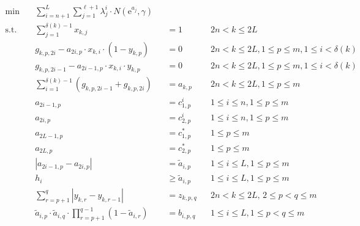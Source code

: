 \documentclass[runningheads]{llncs}
\begin{document}
\begingroup
\allowdisplaybreaks
\begin{align*}
\min\quad        & \sum_{i=n+1}^L\sum_{j=1}^{\ell+1} \lambda^i_j\cdot N(\mathrm e^{a_j},\gamma) & \label{CS} \tag{CSO}\\
\text{s.t.}\quad & \sum_{j=1}^{\delta(k)- 1} x_{k,j}                                  && =     1              && {\scriptstyle 2n < k \leq 2L}\\
                 & g_{k,p,2i}   - a_{2i,p}   \cdot x_{k,i} \cdot (1-y_{k,p})          && =     0              && {\scriptstyle 2n < k \leq 2L, 1 \leq p \leq m, 1 \leq i < \delta(k)}\\
                 & g_{k,p,2i-1} - a_{2i-1,p} \cdot x_{k,i} \cdot y_{k,p}              && =     0              && {\scriptstyle 2n < k \leq 2L, 1 \leq p \leq m, 1 \leq i < \delta(k)}\\
                 & \sum_{i = 1}^{\delta(k) - 1} (g_{k,p,2i-1} + g_{k,p,2i})           && = a_{k,p}            && {\scriptstyle 2n < k \leq 2L, 1 \leq p \leq m}\\
                 & a_{2i-1,p}                                                         && = c^i_{1,p}          && {\scriptstyle 1 \leq i \leq n, 1 \leq p \leq m}\\
                 & a_{2i,p}                                                           && = c^i_{2,p}          && {\scriptstyle 1 \leq i \leq n, 1 \leq p \leq m}\\
                 & a_{2L-1,p}                                                         && = c^*_{1,p}          && {\scriptstyle 1 \leq p \leq m}\\
                 & a_{2L,p}                                                           && = c^*_{2,p}          && {\scriptstyle 1 \leq p \leq m}\\
                 & |a_{2i-1,p} - a_{2i,p}|                                            && = \tilde{a}_{i,p}    && {\scriptstyle 1 \leq i \leq L, 1 \leq p \leq m}\\
                 & h_i                                                                && \geq \tilde{a}_{i,p} && {\scriptstyle 1 \leq i \leq L, 1 \leq p \leq m}\\
                 & \sum_{r=p+1}^q |y_{k,r} - y_{k,r-1}|                               && = z_{k,p,q}          && {\scriptstyle 2n < k \leq 2L,\, 2 \leq p < q \leq m}\\
                 & \tilde{a}_{i,p}\cdot\tilde{a}_{i,q}\cdot\prod_{r=p+1}^{q-1}(1-\tilde{a}_{i,r}) &&  = b_{i,p,q} && {\scriptstyle 1 \leq i \leq L, 1 \leq p<q \leq m}\\

\end{align*}
\end{document}

